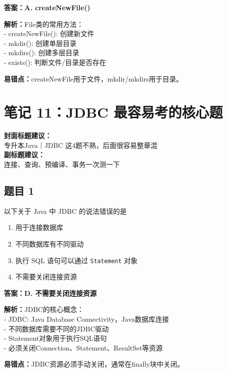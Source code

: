 \documentclass[12pt,a4paper]{ctexart}
\begin{document}
\begin{answerbox}
	\textbf{答案：A. createNewFile()}

	\textbf{解析：}File类的常用方法：\\
	- createNewFile(): 创建新文件\\
	- mkdir(): 创建单层目录\\
	- mkdirs(): 创建多层目录\\
	- exists(): 判断文件/目录是否存在

	\textbf{易错点：}createNewFile用于文件，mkdir/mkdirs用于目录。
\end{answerbox}

\newpage

\section{笔记 11：JDBC 最容易考的核心题}
\begin{coverbox}
	\textbf{封面标题建议：}\\
	专升本Java｜JDBC 这4题不熟，后面很容易整章混\\
	\textbf{副标题建议：}\\
	连接、查询、预编译、事务一次测一下
\end{coverbox}

\subsection*{题目 1}
以下关于 Java 中 JDBC 的说法错误的是
\begin{enumerate}[label=\Alph*.]
	\item 用于连接数据库
	\item 不同数据库有不同驱动
	\item 执行 SQL 语句可以通过 \texttt{Statement} 对象
	\item 不需要关闭连接资源
\end{enumerate}

\begin{answerbox}
	\textbf{答案：D. 不需要关闭连接资源}

	\textbf{解析：}JDBC的核心概念：\\
	- JDBC: Java Database Connectivity，Java数据库连接\\
	- 不同数据库需要不同的JDBC驱动\\
	- Statement对象用于执行SQL语句\\
	- 必须关闭Connection、Statement、ResultSet等资源

	\textbf{易错点：}JDBC资源必须手动关闭，通常在finally块中关闭。
\end{answerbox}
\end{document}
